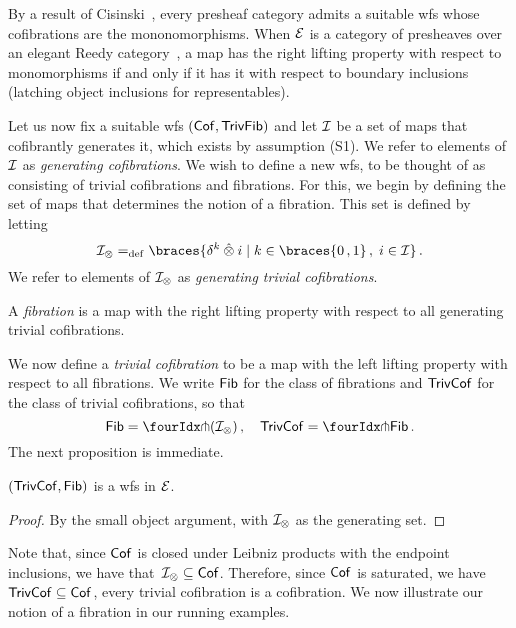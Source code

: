 \documentclass[reqno,10pt,a4paper,oneside,draft]{amsart}
\begin{document}
\begin{example} \label{thm:generation-presheaf-cisinski}
By a result of Cisinski~\cite[Proposition~1.2.27]{cisinski-asterisque}, every presheaf category admits a suitable wfs whose cofibrations are the mononomorphisms.
When $\cal{E}$ is a category of presheaves over an elegant Reedy category~\cite{bergner-rezk-elegant}, a map has the right lifting property with respect to monomorphisms if and only if it has it with respect to boundary inclusions (latching object inclusions for representables).
\end{example}

Let us now fix a suitable wfs $(\Cof,\TrivFib)$ and let $\cal{I}$ be a set of maps that cofibrantly generates it, which exists by assumption (S1). We refer to  elements of $\cal{I}$ as \emph{generating cofibrations}. 
We wish to define a new wfs, to be thought of as consisting of trivial cofibrations and fibrations.
For this, we begin by defining the set of maps that determines the notion of a fibration.
This set is defined by letting
\begin{equation} \label{equ:cylinc}
\cal{I}_\otimes \defeq \braces{\kcyl \hatotimes i \mid k \in \braces{0\,, 1} \, , \; i \in \cal{I} }
\, .\end{equation}
We refer to elements of $\cal{I}_\otimes$ as \emph{generating trivial cofibrations}.

\begin{definition} \label{thm:fib}
A \emph{fibration} is a map with the right lifting property with respect to all generating trivial cofibrations.
\end{definition}

We now define a \emph{trivial cofibration} to be a map with the left lifting property with respect to all fibrations.
We write $\Fib$ for the class of fibrations and $\TrivCof$ for the class of trivial cofibrations, so that 
\[
\Fib = \liftr{(\cal{I}_\otimes)} \, , \quad \TrivCof = \liftl{\Fib} \, .
\]
The next proposition is immediate. 

\begin{proposition} \label{thm:wfstimes}
$(\TrivCof, \Fib)$ is a wfs in $\cal{E}$.
\end{proposition}

\begin{proof} By the small object argument, with $\cal{I}_\otimes$ as the generating set. 
\end{proof} 

Note that, since $\Cof$ is closed under Leibniz products with the endpoint inclusions, we have that~$\cal{I}_\otimes \subseteq \Cof$. Therefore, since $\Cof$ is saturated, we have $\TrivCof \subseteq \Cof$, \ie every trivial cofibration is a cofibration.
We now illustrate our notion of a fibration in our running examples.
\end{document}
